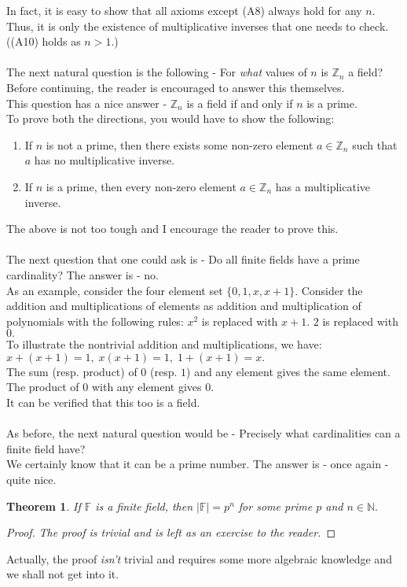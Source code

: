 \documentclass[12pt]{article}
\newtheorem{theorem}{Theorem}
\begin{document}
In fact, it is easy to show that all axioms except (A8) always hold for any $n.$ Thus, it is only the existence of multiplicative inverses that one needs to check. ((A10) holds as $n > 1$.)\\~\\
The next natural question is the following - For \emph{what} values of $n$ is $\mathbb{Z}_n$ a field?\\
Before continuing, the reader is encouraged to answer this themselves. \\
This question has a nice answer - $\mathbb{Z}_n$ is a field if and only if $n$ is a prime.\\
To prove both the directions, you would have to show the following:
\begin{enumerate}[nosep] 
	\item If $n$ is not a prime, then there exists some non-zero element $a \in \mathbb{Z}_n$ such that $a$ has no multiplicative inverse.
	\item If $n$ is a prime, then every non-zero element $a \in \mathbb{Z}_n$ has a multiplicative inverse.
\end{enumerate}
The above is not too tough and I encourage the reader to prove this.\\~\\
%
The next question that one could ask is - Do all finite fields have a prime cardinality? The answer is - no.\\
As an example, consider the four element set $\{0, 1, x, x + 1\}.$ Consider the addition and multiplications of elements as addition and multiplication of polynomials with the following rules: $x^2$ is replaced with $x+1.$ $2$ is replaced with $0.$\\
To illustrate the nontrivial addition and multiplications, we have:\\
$x + (x + 1) = 1,\;x(x+1) = 1,\;1 + (x + 1) = x.$\\
The sum (resp. product) of $0$ (resp. $1$) and any element gives the same element. The product of $0$ with any element gives $0.$\\
It can be verified that this too is a field.\\~\\
As before, the next natural question would be - Precisely what cardinalities can a finite field have?\\
We certainly know that it can be a prime number. The answer is - once again - quite nice.
\begin{theorem} 
	If $\mathbb{F}$ is a finite field, then $|\mathbb{F}| = p^n$ for some prime $p$ and $n \in \mathbb{N}.$
\end{theorem}
\begin{proof} 
	\emph{The proof is trivial and is left as an exercise to the reader.}
\end{proof}
Actually, the proof \emph{isn't} trivial and requires some more algebraic knowledge and we shall not get into it.
\end{document}
